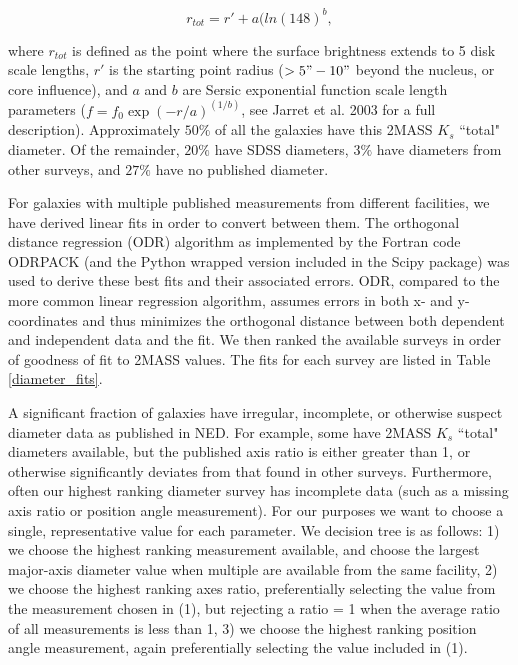 \documentclass[iop]{emulateapj-rtx4}
\begin{document}
\begin{equation}
r_{tot} = r' + a(ln(148)^b,
\end{equation}

\noindent where $r_{tot}$ is defined as the point where the surface brightness extends to 5 disk scale lengths, $r'$ is the starting point radius ($>5" - 10"$ beyond the nucleus, or core influence), and $a$ and $b$ are Sersic exponential function scale length parameters ($f = f_0 \exp{(-r/a)}^{(1/b)}$, see Jarret et al. 2003 for a full description). Approximately $50\%$ of all the galaxies have this 2MASS $K_s$ ``total" diameter. Of the remainder, $20\%$ have SDSS diameters, $3\%$ have diameters from other surveys, and $27\%$ have no published diameter. 

For galaxies with multiple published measurements from different facilities, we have derived linear fits in order to convert between them. The orthogonal distance regression (ODR) algorithm as implemented by the Fortran code ODRPACK (and the Python wrapped version included in the Scipy package) was used to derive these best fits and their associated errors. ODR, compared to the more common linear regression algorithm, assumes errors in both x- and y-coordinates and thus minimizes the orthogonal distance between both dependent and independent data and the fit. We then ranked the available surveys in order of goodness of fit to 2MASS values. The fits for each survey are listed in Table \ref{diameter_fits}. 

A significant fraction of galaxies have irregular, incomplete, or otherwise suspect diameter data as published in NED. For example, some have 2MASS $K_s$ ``total" diameters available, but the published axis ratio is either greater than 1, or otherwise significantly deviates from that found in other surveys. Furthermore, often our highest ranking diameter survey has incomplete data (such as a missing axis ratio or position angle measurement). For our purposes we want to choose a single, representative value for each parameter. We decision tree is as follows: 1) we choose the highest ranking measurement available, and choose the largest major-axis diameter value when multiple are available from the same facility, 2) we choose the highest ranking axes ratio, preferentially selecting the value from the measurement chosen in (1), but rejecting a ratio = 1 when the average ratio of all measurements is less than 1, 3) we choose the highest ranking position angle measurement, again preferentially selecting the value included in (1). 
\end{document}
